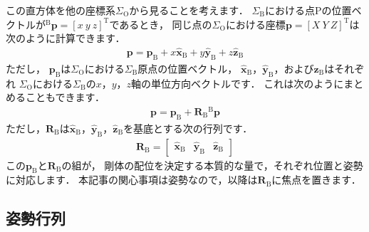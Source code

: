 ﻿\documentclass[a4paper]{jsarticle}
\begin{document}
この直方体を他の座標系$\Sigma_{\mathrm{O}}$から見ることを考えます．
$\Sigma_{\mathrm{B}}$における点Pの位置ベクトルが${}^{\mathrm{B}}\boldsymbol{p}=[x~y~z]^{\mathrm{T}}$であるとき，
同じ点の$\Sigma_{\mathrm{O}}$における座標$\boldsymbol{p}=[X~Y~Z]^{\mathrm{T}}$は次のように計算できます．
\begin{align*}
\boldsymbol{p}=\boldsymbol{p}_{\mathrm{B}}+x\hat{\boldsymbol{x}}_{\mathrm{B}}+y\hat{\boldsymbol{y}}_{\mathrm{B}}+z\hat{\boldsymbol{z}}_{\mathrm{B}}
\end{align*}
ただし，
$\boldsymbol{p}_{\mathrm{B}}$は$\Sigma_{\mathrm{O}}$における$\Sigma_{\mathrm{B}}$原点の位置ベクトル，
$\hat{\boldsymbol{x}}_{\mathrm{B}}$，$\hat{\boldsymbol{y}}_{\mathrm{B}}$，および$\hat{\boldsymbol{z}}_{\mathrm{B}}$はそれぞれ
$\Sigma_{\mathrm{O}}$における$\Sigma_{\mathrm{B}}$の$x$，$y$，$z$軸の単位方向ベクトルです．
これは次のようにまとめることもできます．
\begin{align*}
\boldsymbol{p}=\boldsymbol{p}_{\mathrm{B}}+\boldsymbol{R}_{\mathrm{B}}{}^{\mathrm{B}}\boldsymbol{p}
\end{align*}
ただし，$\boldsymbol{R}_{\mathrm{B}}$は$\hat{\boldsymbol{x}}_{\mathrm{B}}$，$\hat{\boldsymbol{y}}_{\mathrm{B}}$，$\hat{\boldsymbol{z}}_{\mathrm{B}}$を基底とする次の行列です．
\begin{align*}
\boldsymbol{R}_{\mathrm{B}}
=\begin{bmatrix} \hat{\boldsymbol{x}}_{\mathrm{B}} & \hat{\boldsymbol{y}}_{\mathrm{B}} & \hat{\boldsymbol{z}}_{\mathrm{B}} \end{bmatrix}
\end{align*}
この$\boldsymbol{p}_{\mathrm{B}}$と$\boldsymbol{R}_{\mathrm{B}}$の組が，
剛体の配位を決定する本質的な量で，それぞれ位置と姿勢に対応します．
本記事の関心事項は姿勢なので，以降は$\boldsymbol{R}_{\mathrm{B}}$に焦点を置きます．



\subsection{姿勢行列}
\end{document}
